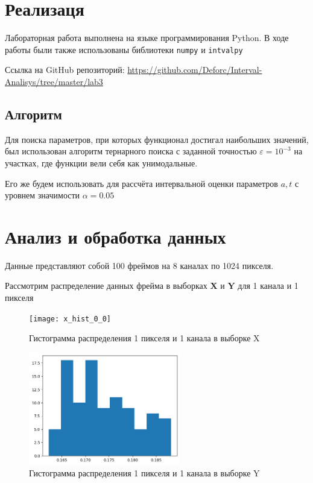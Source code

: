 \documentclass{article}
\begin{document}
  \section{Реализаця}

  Лабораторная работа выполнена на языке программирования Python. В ходе
  работы были также использованы библиотеки \verb!numpy! и \verb!intvalpy!

  Ссылка на GitHub репозиторий:
  \url{https://github.com/Deforc/Interval-Analisys/tree/master/lab3}

  \subsection{Алгоритм}

  Для поиска параметров, при которых функционал достигал наибольших
  значений, был использован алгоритм тернарного поиска с заданной точностью
  \( \varepsilon = 10^{-3} \) на участках, где функции вели
  себя как унимодальные.

  Его же будем использовать для рассчёта интервальной оценки параметров \( a, t\) с уровнем значимости \( \alpha = 0.05 \)

  \section{Анализ и обработка данных}
  
  Данные представляют собой 100 фреймов на 8 каналах по 1024 пикселя.

  Рассмотрим распределение данных фрейма в выборках \(\mathbf{X}\) и \(\mathbf{Y}\) для 1 канала и 1 пикселя
  \begin{figure}[htbp!]
      \begin{center}
          \texttt{[image: x\_hist\_0\_0]}
          \caption{Гистограмма распределения 1 пикселя и 1 канала в выборке X}
  \label{figure:hist_0_0}
      \end{center}
  \end{figure}

  \begin{figure}[htbp!]
    \begin{center}
        \includegraphics[width = 0.59\textwidth]{y_hist_0_0}
        \caption{Гистограмма распределения 1 пикселя и 1 канала в выборке Y}
\label{figure:hist_0_0}
    \end{center}
\end{figure}
\end{document}

